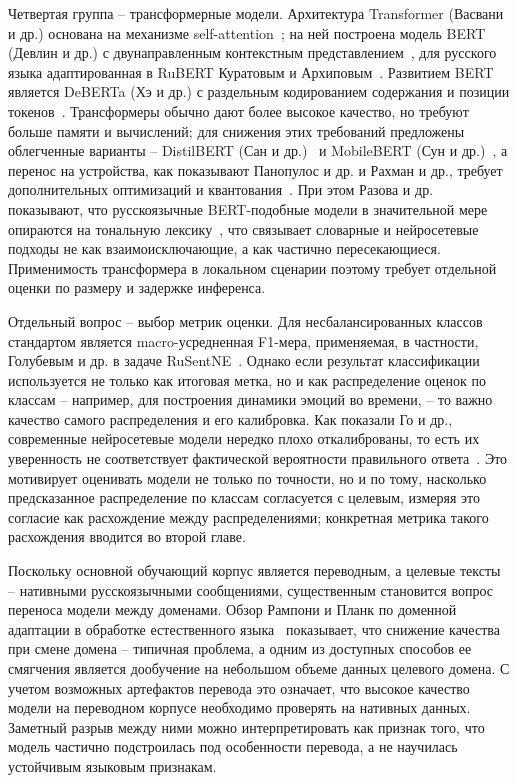 \documentclass[12pt,a4paper]{report}
\begin{document}
Четвертая группа -- трансформерные модели. Архитектура Transformer (Васвани и др.) основана на механизме self-attention~\cite{vaswani2017attention}; на ней построена модель BERT (Девлин и др.) с двунаправленным контекстным представлением~\cite{devlin2019bert}, для русского языка адаптированная в RuBERT Куратовым и Архиповым~\cite{kuratov2019rubert}. Развитием BERT является DeBERTa (Хэ и др.) с раздельным кодированием содержания и позиции токенов~\cite{he2021deberta}. Трансформеры обычно дают более высокое качество, но требуют больше памяти и вычислений; для снижения этих требований предложены облегченные варианты -- DistilBERT (Сан и др.)~\cite{sanh2019distilbert} и MobileBERT (Сун и др.)~\cite{sun2020mobilebert}, а перенос на устройства, как показывают Панопулос и др. и Рахман и др., требует дополнительных оптимизаций и квантования~\cite{panopoulos2023mobiletransformers,rahman2023quantized}. При этом Разова и др. показывают, что русскоязычные BERT-подобные модели в значительной мере опираются на тональную лексику~\cite{razova2021bertlexicon}, что связывает словарные и нейросетевые подходы не как взаимоисключающие, а как частично пересекающиеся. Применимость трансформера в локальном сценарии поэтому требует отдельной оценки по размеру и задержке инференса.

Отдельный вопрос -- выбор метрик оценки. Для несбалансированных классов стандартом является macro-усредненная F1-мера, применяемая, в частности, Голубевым и др. в задаче RuSentNE~\cite{golubev2023rusentne}. Однако если результат классификации используется не только как итоговая метка, но и как распределение оценок по классам -- например, для построения динамики эмоций во времени, -- то важно качество самого распределения и его калибровка. Как показали Го и др., современные нейросетевые модели нередко плохо откалиброваны, то есть их уверенность не соответствует фактической вероятности правильного ответа~\cite{guo2017calibration}. Это мотивирует оценивать модели не только по точности, но и по тому, насколько предсказанное распределение по классам согласуется с целевым, измеряя это согласие как расхождение между распределениями; конкретная метрика такого расхождения вводится во второй главе.

Поскольку основной обучающий корпус является переводным, а целевые тексты -- нативными русскоязычными сообщениями, существенным становится вопрос переноса модели между доменами. Обзор Рампони и Планк по доменной адаптации в обработке естественного языка~\cite{ramponi2020da} показывает, что снижение качества при смене домена -- типичная проблема, а одним из доступных способов ее смягчения является дообучение на небольшом объеме данных целевого домена. С учетом возможных артефактов перевода это означает, что высокое качество модели на переводном корпусе необходимо проверять на нативных данных. Заметный разрыв между ними можно интерпретировать как признак того, что модель частично подстроилась под особенности перевода, а не научилась устойчивым языковым признакам.
\end{document}
